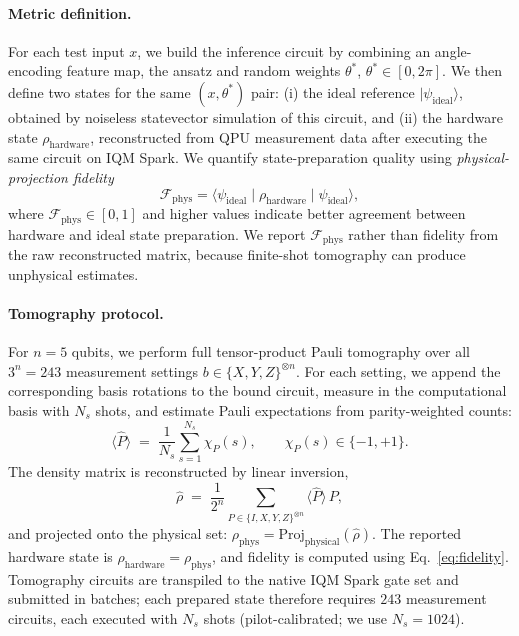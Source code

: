 \documentclass[letterpaper]{article} %
\begin{document}
\paragraph{Metric definition.}
For each test input $x$, we build the inference circuit by combining an angle-encoding feature map, the ansatz and random weights $\theta^{*}$, $\theta^{*} \in [0,2\pi]$. We then define two states for the same $(x,\theta^{*})$ pair: (i) the ideal reference $|\psi_{\mathrm{ideal}}\rangle$, obtained by noiseless
statevector simulation of this circuit, and
(ii) the hardware state $\rho_{\mathrm{hardware}}$, reconstructed from QPU measurement
data after executing the same circuit on IQM Spark.
We quantify state-preparation quality using \emph{physical-projection fidelity}
\begin{equation}
  \mathcal{F}_{\mathrm{phys}}
  =
  \langle \psi_{\mathrm{ideal}} \mid \rho_{\mathrm{hardware}} \mid \psi_{\mathrm{ideal}} \rangle,
  \label{eq:fidelity}
\end{equation}
where $\mathcal{F}_{\mathrm{phys}} \in [0,1]$ and higher values indicate better agreement
between hardware and ideal state preparation.
We report $\mathcal{F}_{\mathrm{phys}}$ rather than fidelity from the raw reconstructed
matrix, because finite-shot tomography can produce unphysical estimates.

\paragraph{Tomography protocol.}
For $n=5$ qubits, we perform full tensor-product Pauli tomography over all
$3^n=243$ measurement settings $b \in \{X,Y,Z\}^{\otimes n}$.
For each setting, we append the corresponding basis rotations to the bound circuit,
measure in the computational basis with $N_s$ shots, and estimate Pauli expectations from
parity-weighted counts:
\begin{equation}
  \langle \widehat{P}\rangle
  \;=\;
  \frac{1}{N_s}\sum_{s=1}^{N_s}\chi_P(s),
  \qquad \chi_P(s)\in\{-1,+1\}.
  \label{eq:pauli-estimator}
\end{equation}
The density matrix is reconstructed by linear inversion,
\begin{equation}
  \hat{\rho}
  \;=\;
  \frac{1}{2^n}\sum_{P\in\{I,X,Y,Z\}^{\otimes n}}
  \langle \widehat{P}\rangle\, P,
  \label{eq:linear-inversion}
\end{equation}
and projected onto the physical set:
$\rho_{\mathrm{phys}}=\mathrm{Proj}_{\mathrm{physical}}(\hat{\rho})$.
The reported hardware state is $\rho_{\mathrm{hardware}}=\rho_{\mathrm{phys}}$, and fidelity
is computed using Eq.~\eqref{eq:fidelity}.
Tomography circuits are transpiled to the native IQM Spark gate set and submitted in batches;
each prepared state therefore requires $243$ measurement circuits, each executed with
$N_s$ shots (pilot-calibrated; we use $N_s=1024$).
\end{document}
